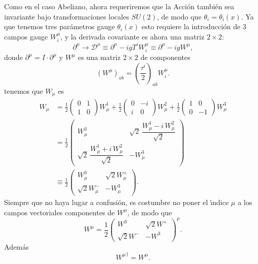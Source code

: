 Como en el caso Abeliano, ahora requeriremos que la Acci\'on tambi\'en sea invariante bajo transformaciones locales $SU(2)$, de modo que $\theta_i=\theta_i(x)$. Ya que tenemos tres par\'ametros gauge $\theta_i(x)$ esto requiere la introducci\'on de 3 campos gauge $W^\mu_i$, y la derivada covariante es ahora una matriz $2\times2$:
\begin{equation}
  \label{eq:65}
\partial^\mu\to\mathcal{D}^\mu\equiv\partial^\mu-igT^iW^\mu_i\equiv\partial^\mu-igW^\mu,
\end{equation}
donde $\partial^\mu=I\cdot\partial^\mu$ y $W^\mu$ es una matriz $2\times2$  de componentes
\begin{equation}
  \label{eq:165}
  \left(W^\mu\right)_{ab}=\left(\frac{\tau^i}{2}\right)_{ab}W^\mu_i.
\end{equation}
tenemos que  $W_\mu$ es
\begin{align}
  \label{eq:195}
  W_\mu&=
  \frac{1}{2}\begin{pmatrix}
    0&1\\
    1&0
  \end{pmatrix}W^1_\mu+
  \frac{1}{2}\begin{pmatrix}
    0&-i\\
    i&0
  \end{pmatrix}W^2_\mu+
  \frac{1}{2}\begin{pmatrix}
    1&0\\
    0&-1
  \end{pmatrix}W^3_\mu\nonumber\\
  &=
  \frac{1}{2}\begin{pmatrix}
    W^3_\mu                                  &\sqrt{2}\,\dfrac{W^1_\mu-i\,W^2_\mu}{\sqrt{2}}\\
    \sqrt{2}\,\dfrac{W^1_\mu+i\,W^2_\mu}{\sqrt{2}} &-W^3_\mu
  \end{pmatrix}\nonumber\\
  &\equiv
  \frac{1}{2}\begin{pmatrix}
    W^3_\mu&\sqrt{2}W^+_\mu\\
    \sqrt{2}W^-_\mu&-W^3_\mu
  \end{pmatrix}.
\end{align}
Siempre que no haya lugar a confusi\'on, es costumbre no poner el \'\i ndice $\mu$ a los campos vectoriales componentes de $W^\mu$, de modo que
\begin{equation}
  \label{eq:71}
    W^\mu=\frac{1}{2}\begin{pmatrix}
    W^3&\sqrt{2}W^+\\
    \sqrt{2}W^-&-W^3
  \end{pmatrix}^\mu.
\end{equation}
Adem\'as
\begin{equation}
  \label{eq:70}
  {W^\mu}^\dagger=W^\mu.
\end{equation}

